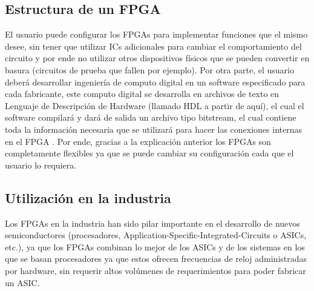 \documentclass[twoside,spanish,ESP,MSc]{plantillaLabUPV}
\theoremstyle{definition}
\newcommand{\f}{FPGA }
\newcommand{\fs}{FPGAs }
\begin{document}
\subsection{Estructura de un \f}%



El usuario puede configurar los \fs   para implementar funciones que el mismo desee, sin tener que utilizar ICs adicionales para cambiar el comportamiento del circuito y por ende no utilizar otros dispositivos físicos que se pueden convertir en basura (circuitos de prueba que fallen por ejemplo). Por otra parte, el usuario deberá desarrollar ingeniería de computo digital en un software especificado para cada fabricante, este computo digital se desarrolla en archivos de texto en Lenguaje de Descripción de Hardware (llamado HDL a partir de aquí), el cual el software compilará y dará de salida un archivo tipo bitstream, el cual contiene toda la información necesaria que se utilizará para hacer las conexiones internas en el \f. Por ende, gracias a la explicación anterior los \fs son completamente flexibles ya que se puede cambiar su configuración cada que el usuario lo requiera. \\


\subsection*{Utilización en la industria}

Los \fs en la industria han sido pilar importante en el desarrollo de nuevos semiconductores (procesadores, Application-Specific-Integrated-Circuits o ASICs, etc.), ya que los \fs combinan lo mejor de los ASICs y de los sistemas en los que se basan procesadores ya que estos ofrecen frecuencias de reloj administradas por hardware, sin requerir altos volúmenes de requerimientos para poder fabricar un ASIC. %
\end{document}
